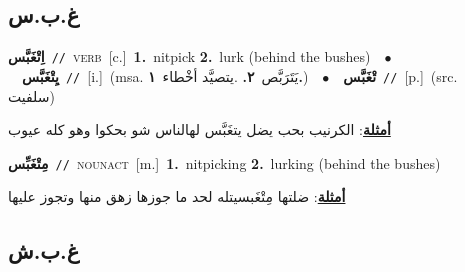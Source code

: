 \documentclass[10pt,a4paper,twoside]{article} %
\begin{document}
\begin{multicols}{2}
{{\vspace{-3mm}
\subsection*{\color{blue}\foreignlanguage{arabic}{غ.ب.س}\color{blue}{}} 

{\setlength\topsep{0pt}\textbf{\foreignlanguage{arabic}{اِتْغَبَّس}}\ {\color{gray}\texttt{//}\color{black}}\ \textsc{verb}\ [c.]\ \textbf{1.}~nitpick  \textbf{2.}~lurk (behind the bushes)\ \ $\bullet$\ \ \setlength\topsep{0pt}\textbf{\foreignlanguage{arabic}{يِتْغَبَّس}}\ {\color{gray}\texttt{//}\color{black}}\ [i.]\ \color{gray}(msa. \foreignlanguage{arabic}{يَتَرَبَّص}~\foreignlanguage{arabic}{\textbf{٢.}}  .\foreignlanguage{arabic}{يتصيَّد أخْطاء}~\foreignlanguage{arabic}{\textbf{١.}})\color{black}\ \ $\bullet$\ \ \setlength\topsep{0pt}\textbf{\foreignlanguage{arabic}{تْغَبَّس}}\ {\color{gray}\texttt{//}\color{black}}\ [p.]\ (src. \color{gray}\foreignlanguage{arabic}{سلفيت}\color{black})\  \begin{flushright}\color{gray}\foreignlanguage{arabic}{\textbf{\underline{\foreignlanguage{arabic}{أمثلة}}}: الكرنيب بحب يضل يتغَبَّس لهالناس شو بحكوا وهو كله عيوب}\end{flushright}\color{black}} \vspace{2mm}

{\setlength\topsep{0pt}\textbf{\foreignlanguage{arabic}{مِتْغَبِّس}}\ {\color{gray}\texttt{//}\color{black}}\ \textsc{noun\textunderscore act}\ [m.]\ \textbf{1.}~nitpicking  \textbf{2.}~lurking (behind the bushes)\  \begin{flushright}\color{gray}\foreignlanguage{arabic}{\textbf{\underline{\foreignlanguage{arabic}{أمثلة}}}: ضلتها مِتْغَبسيتله لحد ما جوزها زهق منها وتجوز عليها}\end{flushright}\color{black}} \vspace{2mm}

\vspace{-3mm}
\subsection*{\color{blue}\foreignlanguage{arabic}{غ.ب.ش}\color{blue}{}} 

}}
\end{multicols}
\end{document}
